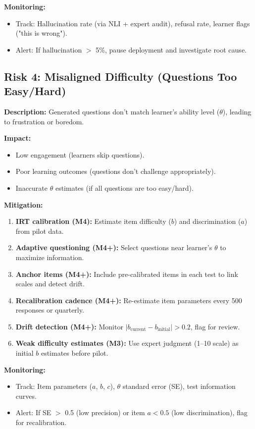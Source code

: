 \documentclass[11pt,letterpaper]{article}
\begin{document}
\textbf{Monitoring:}
\begin{itemize}
\item Track: Hallucination rate (via NLI + expert audit), refusal rate, learner flags ("this is wrong").
\item Alert: If hallucination $>$ 5\%, pause deployment and investigate root cause.
\end{itemize}

\subsection{Risk 4: Misaligned Difficulty (Questions Too Easy/Hard)}

\textbf{Description:} Generated questions don't match learner's ability level ($\theta$), leading to frustration or boredom.

\textbf{Impact:}
\begin{itemize}
\item Low engagement (learners skip questions).
\item Poor learning outcomes (questions don't challenge appropriately).
\item Inaccurate $\theta$ estimates (if all questions are too easy/hard).
\end{itemize}

\textbf{Mitigation:}
\begin{enumerate}
\item \textbf{IRT calibration (M4):} Estimate item difficulty ($b$) and discrimination ($a$) from pilot data.
\item \textbf{Adaptive questioning (M4+):} Select questions near learner's $\theta$ to maximize information.
\item \textbf{Anchor items (M4+):} Include pre-calibrated items in each test to link scales and detect drift.
\item \textbf{Recalibration cadence (M4+):} Re-estimate item parameters every 500 responses or quarterly.
\item \textbf{Drift detection (M4+):} Monitor $|b_{\text{current}} - b_{\text{initial}}| > 0.2$, flag for review.
\item \textbf{Weak difficulty estimates (M3):} Use expert judgment (1--10 scale) as initial $b$ estimates before pilot.
\end{enumerate}

\textbf{Monitoring:}
\begin{itemize}
\item Track: Item parameters ($a$, $b$, $c$), $\theta$ standard error (SE), test information curves.
\item Alert: If SE $>$ 0.5 (low precision) or item $a < 0.5$ (low discrimination), flag for recalibration.
\end{itemize}
\end{document}
